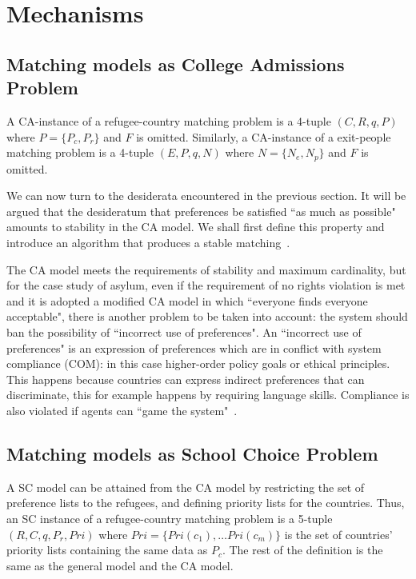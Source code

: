 \section{Mechanisms}\label{mechanisms}%


\subsection{Matching models as College Admissions Problem}\label{matching-model-as-college-admissions-problem}%

A CA-instance of a refugee-country matching problem is a 4-tuple \((C, R, q, P)\) where \(P = \{P_c, P_r\}\) and \(F\) is omitted.
Similarly, a CA-instance of a exit-people matching problem is a 4-tuple \((E, P, q, N)\) where \(N = \{N_e ,  N_p\}\) and \(F\) is omitted.

We can now turn to the desiderata encountered in the previous section.
It will be argued that the desideratum that preferences be satisfied “as much as possible" amounts to stability in the CA
model.
We shall first define this property and introduce an algorithm that produces a stable matching~\cite{basshuysen}.

The CA model meets the requirements of stability and maximum cardinality, but for the case study of asylum, even if the requirement of no rights violation is met and it is adopted a modified CA model in which “everyone finds everyone acceptable", there is another problem to be taken into account: the system should ban the possibility of “incorrect use of preferences".
An “incorrect use of preferences" is an expression of preferences which are in conflict with system compliance (COM): in this case higher-order policy goals or ethical principles.
This happens because countries can express indirect preferences that can discriminate, this for example happens by requiring language skills.
Compliance is also violated if agents can “game the system"~\cite{basshuysen}.


\subsection{Matching models as School Choice Problem}\label{matching-model-as-school-choice-problem}%

A SC model can be attained from the CA model by restricting the set of preference lists to the refugees, and defining priority lists for the countries.
Thus, an SC instance of a refugee-country matching problem is a 5-tuple \((R, C, q, P_r, Pri)\) where \(Pri = \{Pri(c_1), \ldots Pri(c_m)\}\) is the set of countries’ priority lists containing the same data as \(P_c\).
The rest of the definition is the same as the general model and the CA model.

